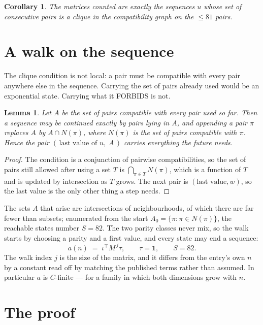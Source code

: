 \documentclass[11pt,a4paper]{article}
\theoremstyle{plain}
\newtheorem{lemma}[theorem]{Lemma}
\newtheorem{corollary}[theorem]{Corollary}
\theoremstyle{definition}
\begin{document}
\begin{corollary}
The matrices counted are exactly the sequences $u$ whose set of consecutive pairs is a clique in
the compatibility graph on the $\le 81$ pairs.
\end{corollary}

\section{A walk on the sequence}

The clique condition is not local: a pair must be compatible with every pair anywhere else in
the sequence. Carrying the set of pairs already used would be an exponential state. Carrying
what it FORBIDS is not.

\begin{lemma}\label{lem:lump}
Let $A$ be the set of pairs compatible with every pair used so far. Then a sequence may be
continued exactly by pairs lying in $A$, and appending a pair $\pi$ replaces $A$ by
$A\cap N(\pi)$, where $N(\pi)$ is the set of pairs compatible with $\pi$. Hence the pair
$(\,\text{last value of }u,\;A\,)$ carries everything the future needs.
\end{lemma}

\begin{proof}
The condition is a conjunction of pairwise compatibilities, so the set of pairs still allowed
after using a set $T$ is $\bigcap_{\pi\in T}N(\pi)$, which is a function of $T$ and is updated
by intersection as $T$ grows. The next pair is $(\text{last value},w)$, so the last value is
the only other thing a step needs.
\end{proof}

The sets $A$ that arise are intersections of neighbourhoods, of which there are far fewer than
subsets; enumerated from the start $A_0=\{\pi:\pi\in N(\pi)\}$, the reachable states number
$S=82$. The two parity classes never mix, so the walk starts by choosing a parity and a first
value, and every state may end a sequence:
\[
a(n)\;=\;\iota^{\!\top}M^{\,j}\tau ,\qquad \tau=\mathbf{1},\qquad S=82.
\]
The walk index $j$ is the size of the matrix, and it differs from the entry's own $n$ by a
constant read off by matching the published terms rather than assumed. In particular $a$ is
$C$-finite --- for a family in which both dimensions grow with $n$.

\section{The proof}
\end{document}
